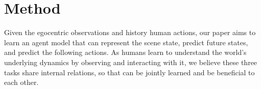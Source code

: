 \section{Method}
\label{sec:method}



Given the egocentric observations and history human actions, 
our paper aims to learn an agent model that 
can represent the scene state, predict future states, and predict the following actions. As humans learn to understand the world's underlying dynamics by observing and interacting with it, we believe these three tasks share internal relations, so that can be jointly learned and be beneficial to each other.

